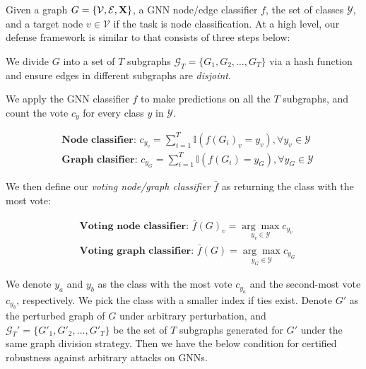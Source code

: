 Given a graph $G=\{\mathcal{V},\mathcal{E},{\bf X}\}$, 
a GNN node/edge classifier $f$, the set of classes $\mathcal{Y}$, and a target node $v\in\mathcal{V}$ if the task is node classification. 
At a high level, our defense framework is similar to \cite{xia2024gnncert} that consists of three steps below:  

\vspace{+0.05in}
 We divide $G$ into 
a set of $T$ subgraphs $\mathcal{G}_T=\{G_{1},G_{2},\dots,G_{T}\}$ via a hash function and ensure  
edges in different subgraphs are \emph{disjoint}. 


\vspace{+0.05in}
 We apply the GNN classifier $f$  to make predictions on all the $T$ subgraphs, and count the vote $c_y$ for every class $y$ in $\mathcal{Y}$. 

{
\vspace{-4mm}
\begin{align}
& \textbf{Node classifier: } c_{y_v} = \sum\nolimits_{i=1}^{T}\mathbb{I}(f(G_{i})_v=y_v), \forall y_v \in \mathcal{Y} \label{eqn:vote_NC} \\
& \textbf{Graph clasifier: } c_{y_G} = \sum\nolimits_{i=1}^{T}\mathbb{I}(f(G_{i})=y_G), \forall y_G \in \mathcal{Y} \label{eqn:vote_GC} 
\end{align}
}%


We then define our \emph{voting node/graph classifier} $\bar{f}$ as returning the class with the most vote:  


{
\vspace{-4mm}
\begin{align}
& \textbf{Voting node classifier: } \bar{f}(G)_v = \underset{y_v \in \mathcal{Y}}{\arg\max} c_{y_v} \label{eqn:vc_NC} \\
& \textbf{Voting graph classifier: } \bar{f}(G) = \underset{y_G \in \mathcal{Y}}{\arg\max} c_{y_G} \label{eqn:vc_GC} 
\end{align}
}%


\vspace{-2mm}
We denote $y_a$ and $y_b$  as the class with the most vote $c_{y_a}$ and 
the second-most vote $c_{y_b}$, respectively.   
We pick the class with a smaller index if ties exist.  
Denote $G'$ as the perturbed graph of $G$ under arbitrary perturbation, and  $\mathcal{G}_T'=\{G'_{1},G'_{2},\dots,G'_{T}\}$ be the set of $T$ subgraphs generated for $G'$ under the same graph division strategy.  
Then we have the below condition for certified robustness against arbitrary attacks on GNNs.  



